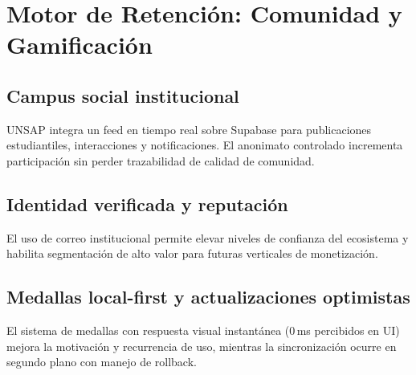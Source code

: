 \documentclass[10.5pt,a4paper]{article}
\begin{document}
\section{Motor de Retención: Comunidad y Gamificación}

\subsection{Campus social institucional}

UNSAP integra un feed en tiempo real sobre Supabase para publicaciones estudiantiles, interacciones y notificaciones. El anonimato controlado incrementa participación sin perder trazabilidad de calidad de comunidad.

\subsection{Identidad verificada y reputación}

El uso de correo institucional permite elevar niveles de confianza del ecosistema y habilita segmentación de alto valor para futuras verticales de monetización.

\subsection{Medallas local-first y actualizaciones optimistas}

El sistema de medallas con respuesta visual instantánea (0\,ms percibidos en UI) mejora la motivación y recurrencia de uso, mientras la sincronización ocurre en segundo plano con manejo de rollback.
\end{document}
